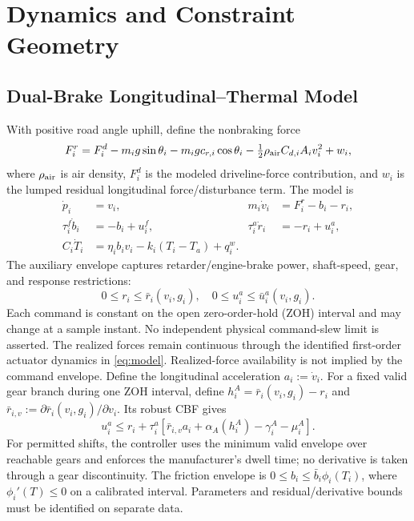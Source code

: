 \section{Dynamics and Constraint Geometry}
\subsection{Dual-Brake Longitudinal--Thermal Model}
With positive road angle uphill, define the nonbraking force
\begin{equation}
F_i^r=F_i^d-m_ig\sin\theta_i-m_igc_{r,i}\cos\theta_i-
\tfrac12\rho_{\rm air}C_{d,i}A_iv_i^2+w_i,
\end{equation}
where $\rho_{\rm air}$ is air density, $F_i^d$ is the modeled driveline-force contribution, and $w_i$ is the lumped residual longitudinal force/disturbance term. The model is
\begin{subequations}\label{eq:model}
\begin{align}
\dot p_i&=v_i, & m_i\dot v_i&=F_i^r-b_i-r_i,\\
\tau_i^f\dot b_i&=-b_i+u_i^f,
&\tau_i^a\dot r_i&=-r_i+u_i^a,\\
C_i\dot T_i&=\eta_i b_iv_i-k_i(T_i-T_a)+q_i^w.
\end{align}
\end{subequations}
The auxiliary envelope captures retarder/engine-brake power, shaft-speed, gear, and response restrictions:
\begin{equation}\label{eq:auxenv}
0\le r_i\le\bar r_i(v_i,g_i),\quad
0\le u_i^a\le\bar u_i^a(v_i,g_i).
\end{equation}
Each command is constant on the open zero-order-hold (ZOH) interval and may change at a sample instant. No independent physical command-slew limit is asserted. The realized forces remain continuous through the identified first-order actuator dynamics in \eqref{eq:model}.
Realized-force availability is not implied by the command envelope. Define the longitudinal acceleration $a_i:=\dot v_i$. For a fixed valid gear branch during one ZOH interval, define $h_i^A=\bar r_i(v_i,g_i)-r_i$ and $\bar r_{i,v}:=\partial\bar r_i(v_i,g_i)/\partial v_i$. Its robust CBF gives
\begin{equation}\label{eq:auxcbf}
u_i^a\le r_i+\tau_i^a\!\left[\bar r_{i,v}a_i+\alpha_A(h_i^A)-\gamma_i^A-\mu_i^A\right].
\end{equation}
For permitted shifts, the controller uses the minimum valid envelope over reachable gears and enforces the manufacturer's dwell time; no derivative is taken through a gear discontinuity.
The friction envelope is $0\le b_i\le\bar b_i\phi_i(T_i)$, where $\phi_i'(T)\le0$ on a calibrated interval. Parameters and residual/derivative bounds must be identified on separate data.

